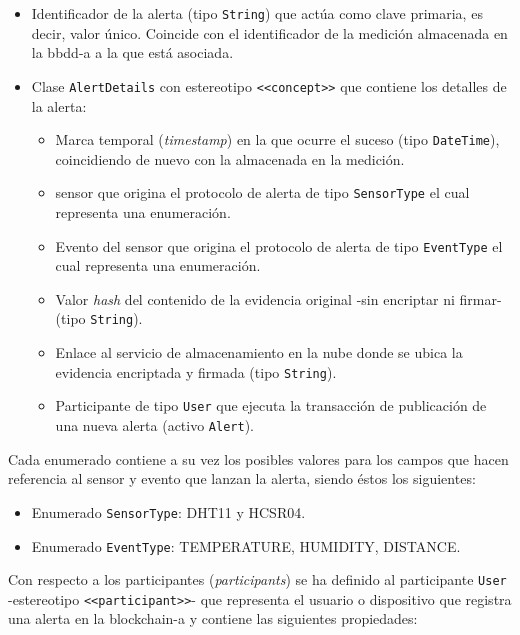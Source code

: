 \documentclass[12pt,a4paper, twoside]{report}
\begin{document}
		\begin{itemize}
			\item Identificador de la alerta (tipo \texttt{String}) que actúa como clave primaria, es decir, valor único. Coincide con el identificador de la medición almacenada en la \gls{bbdd-a} a la que está asociada.
			\item Clase \texttt{AlertDetails} con estereotipo \texttt{<<concept>>} que contiene los detalles de la alerta:
			
			\begin{itemize}
				\item Marca temporal (\textit{timestamp}) en la que ocurre el suceso (tipo \texttt{DateTime}), coincidiendo de nuevo con la almacenada en la medición.
				\item \Gls{sensor} que origina el protocolo de alerta de tipo \texttt{SensorType} el cual representa una enumeración.
				\item Evento del \gls{sensor} que origina el protocolo de alerta de tipo \texttt{EventType} el cual representa una enumeración.
				\item Valor \textit{hash} del contenido de la evidencia original -sin encriptar ni firmar- (tipo \texttt{String}).
				\item Enlace al servicio de almacenamiento en la nube donde se ubica la evidencia encriptada y firmada (tipo \texttt{String}).
				\item Participante de tipo \texttt{User} que ejecuta la transacción de publicación de una nueva alerta (activo \texttt{Alert}).
			\end{itemize}
		\end{itemize}
		
		Cada enumerado contiene a su vez los posibles valores para los campos que hacen referencia al \gls{sensor} y evento que lanzan la alerta, siendo éstos los siguientes:
		
		\begin{itemize}
			\item Enumerado \texttt{SensorType}: DHT11 y HCSR04.
			\item Enumerado \texttt{EventType}: TEMPERATURE, HUMIDITY, DISTANCE.
		\end{itemize}
	
	Con respecto a los participantes (\textit{\glspl{participant}}) se ha definido al participante \texttt{User} -estereotipo \texttt{<<participant>>}- que representa el usuario o dispositivo que registra una alerta en la \gls{blockchain-a} y contiene las siguientes propiedades:
			
\end{document}
